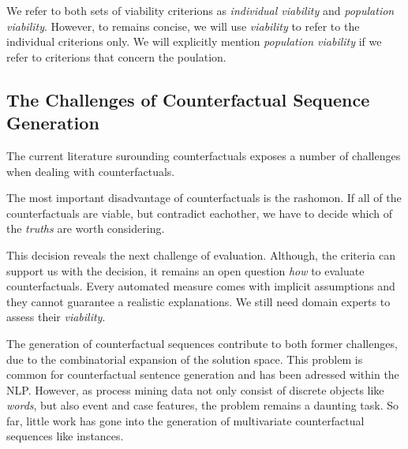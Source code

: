 \documentclass[./../../paper.tex]{subfiles}
\begin{document}
We refer to both sets of viability criterions as \emph{individual viability} and \emph{population viability}. However, to remains concise, we will use \emph{viability} to refer to the individual criterions only. We will explicitly mention \emph{population viability} if we refer to criterions that concern the poulation.



\subsection{The Challenges of Counterfactual Sequence Generation}
The current literature surounding counterfactuals exposes a number of challenges when dealing with counterfactuals.

The most important disadvantage of counterfactuals is the \gls{rashomon}\autocite[ch.9.3]{molnar2019}. If all of the counterfactuals are viable, but contradict eachother, we have to decide which of the \emph{truths} are worth considering.

This decision reveals the next challenge of evaluation\needscite{}. Although, the criteria can support us with the decision, it remains an open question \emph{how} to evaluate counterfactuals. Every automated measure comes with implicit assumptions and they cannot guarantee a realistic explanations. We still need domain experts to assess their \emph{viability}.

The generation of counterfactual sequences contribute to both former challenges, due to the combinatorial expansion of the solution space. This problem is common for counterfactual sentence generation and has been adressed within the \gls{NLP}\needscite{}. However, as process mining data not only consist of discrete objects like \emph{words}, but also event and case features, the problem remains a daunting task. So far, little work has gone into the generation of multivariate counterfactual sequences like \glspl{instance}\needscite{}.


\end{document}
